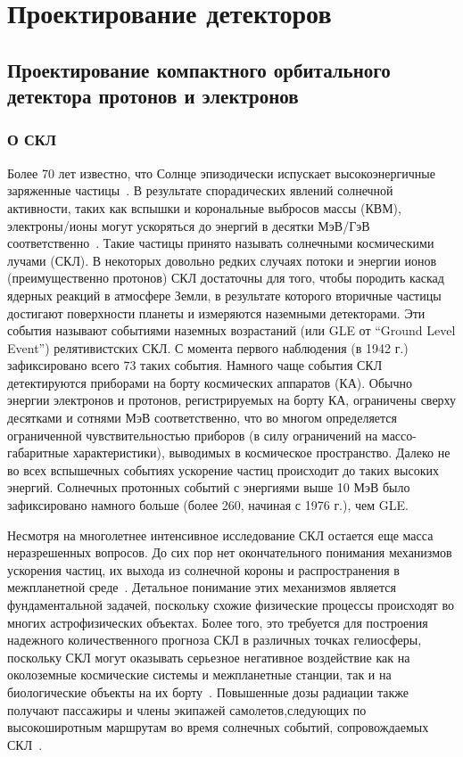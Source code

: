 \chapter{Проектирование детекторов}\label{ch:detectors}

\section{Проектирование компактного орбитального детектора протонов и электронов}\label{sec:detectors/satellite}

\subsection{О СКЛ}

Более 70 лет известно, что Солнце эпизодически испускает высокоэнергичные заряженные частицы~\cite{forbush1946three}. В результате спорадических явлений солнечной активности, таких как вспышки и корональные выбросов массы (КВМ), электроны/ионы могут ускоряться до энергий в десятки МэВ/ГэВ соответственно~\cite{miroshnichenko2015solar}. Такие частицы принято называть солнечными космическими лучами (СКЛ). В некоторых довольно редких случаях потоки и энергии ионов (преимущественно протонов) СКЛ достаточны для того, чтобы породить каскад ядерных реакций в атмосфере Земли, в результате которого вторичные частицы достигают поверхности планеты и измеряются наземными детекторами. Эти события называют событиями наземных возрастаний (или GLE от “Ground Level Event”) релятивистских СКЛ. С момента первого наблюдения (в 1942 г.) зафиксировано всего 73 таких события. Намного чаще события СКЛ детектируются приборами на борту космических аппаратов (КА). Обычно энергии электронов и протонов, регистрируемых на борту КА, ограничены сверху десятками и сотнями МэВ соответственно, что во многом определяется ограниченной чувствительностью приборов (в силу ограничений на массо-габаритные характеристики), выводимых в космическое пространство. Далеко не во всех вспышечных событиях ускорение частиц происходит до таких высоких энергий. Солнечных протонных событий с энергиями выше 10 МэВ было зафиксировано намного больше (более 260, начиная с 1976 г.), чем GLE.

Несмотря на многолетнее интенсивное исследование СКЛ остается еще масса неразрешенных вопросов. До сих пор нет окончательного понимания механизмов ускорения частиц, их выхода из солнечной короны и распространения в межпланетной среде~\cite{miroshnichenko2015solar, lin2011energy}. Детальное понимание этих механизмов является фундаментальной задачей, поскольку схожие физические процессы происходят во многих астрофизических объектах. Более того, это требуется для построения надежного количественного прогноза СКЛ в различных точках гелиосферы, поскольку СКЛ могут оказывать серьезное негативное воздействие как на околоземные космические системы и межпланетные станции, так и на биологические объекты на их борту~\cite{petrukovich2008, hoff2004interplanetary, iucci2005space, hu2009modeling, zeitlin2013measurements}. Повышенные дозы радиации также получают пассажиры и члены экипажей самолетов,следующих по высокоширотным маршрутам во время солнечных событий, сопровождаемых СКЛ~\cite{beck2005tepc}.

